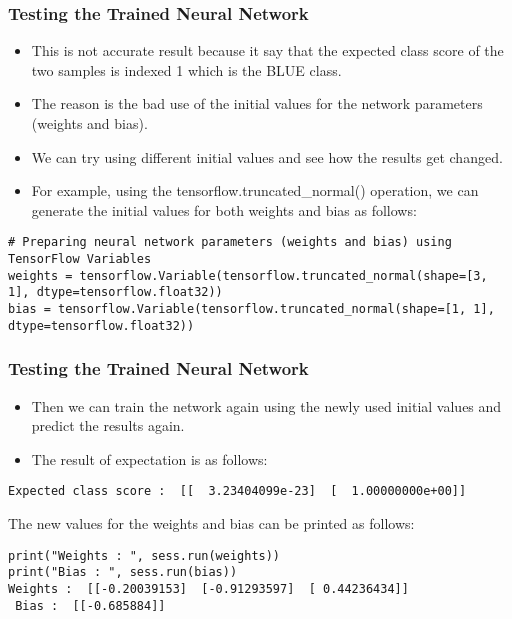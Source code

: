 \begin{frame}[fragile] \frametitle{Testing the Trained Neural Network}

\begin{itemize}
\item This is not accurate result because it say that the expected class score of the two samples is indexed 1 which is the BLUE class. 
\item The reason is the bad use of the initial values for the network parameters (weights and bias). 
\item We can try using different initial values and see how the results get changed. 
\item For example, using the tensorflow.truncated\_normal() operation, we can generate the initial values for both weights and bias as follows:
\end{itemize}
\begin{lstlisting}
# Preparing neural network parameters (weights and bias) using TensorFlow Variables  
weights = tensorflow.Variable(tensorflow.truncated_normal(shape=[3, 1], dtype=tensorflow.float32))  
bias = tensorflow.Variable(tensorflow.truncated_normal(shape=[1, 1], dtype=tensorflow.float32)) 
\end{lstlisting}
\end{frame}

\begin{frame}[fragile] \frametitle{Testing the Trained Neural Network}

\begin{itemize}
\item Then we can train the network again using the newly used initial values and predict the results again. 
\item The result of expectation is as follows:
\end{itemize}
\begin{lstlisting}
Expected class score :  [[  3.23404099e-23]  [  1.00000000e+00]]
\end{lstlisting}
The new values for the weights and bias can be printed as follows:
\begin{lstlisting}
print("Weights : ", sess.run(weights))  
print("Bias : ", sess.run(bias)) 
Weights :  [[-0.20039153]  [-0.91293597]  [ 0.44236434]]  
 Bias :  [[-0.685884]]  
\end{lstlisting}
\end{frame}

